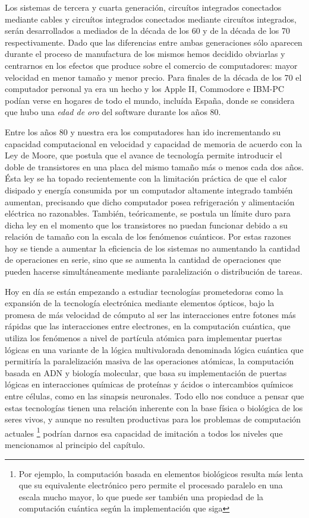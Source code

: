 \documentclass[12pt]{memoir}
\begin{document}
Los sistemas de tercera y cuarta generación, circuítos integrados conectados mediante cables y circuítos integrados conectados mediante circuítos integrados, serán desarrollados a mediados de la década de los 60 y de la década de los 70 respectivamente. Dado que las diferencias entre ambas generaciones sólo aparecen durante el proceso de manufactura de los mismos hemos decidido obviarlas y centrarnos en los efectos que produce sobre el comercio de computadores: mayor velocidad en menor tamaño y menor precio. Para finales de la década de los 70 el computador personal ya era un hecho y los Apple II, Commodore e IBM-PC podían verse en hogares de todo el mundo, incluída España, donde se considera que hubo una \textit{edad de oro} del software durante los años 80.

Entre los años 80 y nuestra era los computadores han ido incrementando su capacidad computacional en velocidad y capacidad de memoria de acuerdo con la Ley de Moore, que postula que el avance de tecnología permite introducir el doble de transistores en una placa del mismo tamaño más o menos cada dos años. Ésta ley se ha topado recientemente con la limitación práctica de que el calor disipado y energía consumida por un computador altamente integrado también aumentan, precisando que dicho computador posea refrigeración y alimentación eléctrica no razonables. También, teóricamente, se postula un límite duro para dicha ley en el momento que los transistores no puedan funcionar debido a su relación de tamaño con la escala de los fenómenos cuánticos. Por estas razones hoy se tiende a aumentar la eficiencia de los sistemas no aumentando la cantidad de operaciones en serie, sino que se aumenta la cantidad de operaciones que pueden hacerse simultáneamente mediante paralelización o distribución de tareas.

Hoy en día se están empezando a estudiar tecnologías prometedoras como la expansión de la tecnología electrónica mediante elementos ópticos, bajo la promesa de más velocidad de cómputo al ser las interacciones entre fotones más rápidas que las interacciones entre electrones, en la computación cuántica, que utiliza los fenómenos a nivel de partícula atómica para implementar puertas lógicas en una variante de la lógica multivalorada denominada lógica cuántica que permitiría la paralelización masiva de las operaciones atómicas, la computación basada en ADN y biología molecular, que basa su implementación de puertas lógicas en interacciones químicas de proteínas y ácidos o intercambios químicos entre células, como en las sinapsis neuronales. Todo ello nos conduce a pensar que estas tecnologías tienen una relación inherente con la base física o biológica de los seres vivos, y aunque no resulten productivas para los problemas de computación actuales \footnote{Por ejemplo, la computación basada en elementos biológicos resulta más lenta que su equivalente electrónico pero permite el procesado paralelo en una escala mucho mayor, lo que puede ser también una propiedad de la computación cuántica según la implementación que siga} podrían darnos esa capacidad de imitación a todos los niveles que mencionamos al principio del capítulo.
\end{document}

